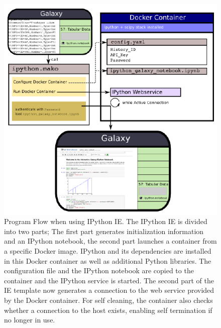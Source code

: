 \documentclass{bioinfo}
\begin{document}
\begin{methods}
\begin{figure}[!tpb]
\centerline{\includegraphics{diagram.pdf}}
\caption{Program Flow when using IPython IE. The IPython IE is divided into two parts;
The first part generates initialization information and an IPython notebook, the second part launches a container
from a specific Docker image. IPython and its dependencies are installed in this Docker container as well as additional Python
libraries. The configuration file and the IPython notebook are copied to the container and the IPython service is started.
The second part of the IE template now generates a connection to the web service provided by the Docker container.
For self cleaning, the container also checks whether a connection to the host exists, enabling self termination 
if no longer in use.}
\label{fig:diagram}
\end{figure}


\end{methods}
\end{document}
